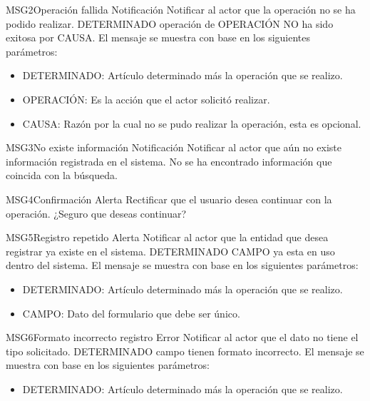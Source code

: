 \begin{Message}{MSG2}{Operación fallida} 
	\MSGitem[Tipo: ] Notificación
	\MSGitem[Objetivo: ] Notificar al actor que la operación no se ha podido realizar. 
	\MSGitem[Redacción: ] DETERMINADO operación de OPERACIÓN NO ha sido exitosa por CAUSA.
	\MSGitem[Parámetros: ] El mensaje se muestra con base en los siguientes parámetros:
		\begin{itemize}	
			\item DETERMINADO: Artículo determinado más la operación que se realizo.
			\item OPERACIÓN: Es la acción que el actor solicitó realizar.
			\item CAUSA: Razón por la cual no se pudo realizar la operación, esta es opcional.
		\end{itemize}
\end{Message}

\begin{Message}{MSG3}{No existe información} 
	\MSGitem[Tipo: ] Notificación
	\MSGitem[Objetivo: ] Notificar al actor que aún no existe información registrada en el sistema.
	\MSGitem[Redacción: ] No se ha encontrado información que coincida con la búsqueda.
\end{Message}

\begin{Message}{MSG4}{Confirmación} 
	\MSGitem[Tipo: ] Alerta
	\MSGitem[Objetivo: ] Rectificar que el usuario desea continuar con la operación.
	\MSGitem[Redacción: ] ¿Seguro que deseas continuar?
\end{Message}

\begin{Message}{MSG5}{Registro repetido} 
	\MSGitem[Tipo: ] Alerta
	\MSGitem[Objetivo: ] Notificar al actor que la entidad que desea registrar ya existe en el sistema.
	\MSGitem[Redacción: ] DETERMINADO CAMPO ya esta en uso dentro del sistema.
	\MSGitem[Parámetros: ] El mensaje se muestra con base en los siguientes parámetros:
		\begin{itemize}	
			\item DETERMINADO: Artículo determinado más la operación que se realizo.
			\item CAMPO: Dato del formulario que debe ser único.
		\end{itemize}
\end{Message}

\begin{Message}{MSG6}{Formato incorrecto registro} 
	\MSGitem[Tipo: ] Error
	\MSGitem[Objetivo: ] Notificar al actor que el dato no tiene el tipo solicitado.
	\MSGitem[Redacción: ] DETERMINADO campo tienen formato incorrecto.
	\MSGitem[Parámetros: ] El mensaje se muestra con base en los siguientes parámetros:
		\begin{itemize}	
			\item DETERMINADO: Artículo determinado más la operación que se realizo.
		\end{itemize}
\end{Message}

